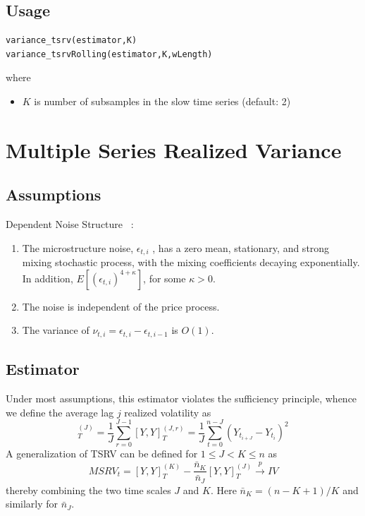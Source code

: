 \documentclass[letterpaper]{report}
\newcounter{N}
\begin{document}
 \subsection{Usage}
\begin{lstlisting}
variance_tsrv(estimator,K)
variance_tsrvRolling(estimator,K,wLength)
\end{lstlisting}
where

\begin{itemize}
\item $K$ is number of subsamples in the slow time series (default: 2)
\end{itemize}

 
\section{Multiple Series Realized Variance}
\subsection{Assumptions}
Dependent Noise Structure ~\cite[Podolskij and Vetter, 2009]{Podolskij_Vetter}:
\begin{enumerate}
\item The microstructure noise, $\epsilon_{t,i}$ , has a zero mean, stationary,
and strong mixing stochastic process, with the mixing coefficients decaying
exponentially. In addition, $E[(\epsilon_{t,i})^{4+\kappa}]$, for some $\kappa
>0$.
\item The noise is independent of the price process.
\item The variance of $\nu_{t,i} = \epsilon_{t,i} - \epsilon_{t,i-1}$ is $O(1)$.
\end{enumerate}
\subsection{Estimator}
Under most assumptions, this estimator violates the sufficiency principle,
whence we define the average lag $j$ realized volatility as
\begin{equation}
[Y,Y]^{(J)}_T = \frac{1}{J}\sum_{r=0}^{J-1}[Y,Y]^{(J,r)}_T =
\frac{1}{J}\sum_{t=0}^{n-J}(Y_{t_{i+J}}-Y_{t_i})^2
\end{equation}
A generalization of TSRV can be defined for $1\leq J < K \leq n$ as
\begin{equation}
MSRV_t = [Y,Y]^{(K)}_T-\frac{\bar{n}_K}{\bar{n}_J}[Y,Y]^{(J)}_T \stackrel{p}{\to} IV
\end{equation}
thereby combining the two time scales $J$ and $K$. Here $\bar{n}_K = (n - K
+1)/K$ and similarly for $\bar{n}_J$.
\end{document}
